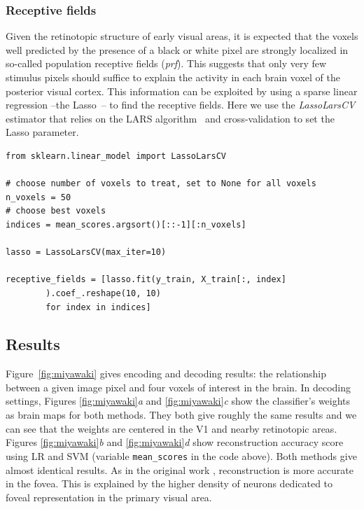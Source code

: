 \documentclass{frontiersSCNS} %
\begin{document}
\subsubsection{Receptive fields}
Given the retinotopic structure of early visual areas, it is expected
that the voxels well predicted by the presence of a black or white pixel
are strongly localized in so-called population
receptive fields (\textit{prf}). This suggests that only very few
stimulus pixels should suffice to explain the activity in each brain
voxel of the posterior visual cortex.
%
This information can be exploited by using a sparse linear
regression --the Lasso~\citep{tibshirani:96}-- to find the receptive fields.
Here we use the \emph{LassoLarsCV} estimator that relies on the LARS
algorithm~\citep{Efron04leastangle} and
cross-validation to set the Lasso parameter.

\begin{lstlisting}
from sklearn.linear_model import LassoLarsCV

# choose number of voxels to treat, set to None for all voxels
n_voxels = 50
# choose best voxels
indices = mean_scores.argsort()[::-1][:n_voxels]

lasso = LassoLarsCV(max_iter=10)

receptive_fields = [lasso.fit(y_train, X_train[:, index]
        ).coef_.reshape(10, 10)
        for index in indices]

\end{lstlisting}

\subsection{Results}

\label{sec:miyawaki_results}
Figure~\ref{fig:miyawaki} gives encoding and decoding results: the relationship
between a given image pixel and four voxels of interest in the brain.
In decoding settings, Figures \ref{fig:miyawaki}\textit{a} and \ref{fig:miyawaki}\textit{c} show the classifier's weights as brain
maps for both methods. They both give roughly the same results and we can
see that the weights are centered in the V1 and nearby retinotopic areas.
Figures \ref{fig:miyawaki}\textit{b} and \ref{fig:miyawaki}\textit{d} show reconstruction
accuracy score using LR and SVM
(variable \texttt{mean\_scores} in the code above).
Both methods give almost identical results. 
As in the original work \citep{miyawaki2008}, reconstruction is more
accurate in the fovea.
This is explained by the higher density of neurons dedicated to
foveal representation in the primary visual area.
\end{document}
